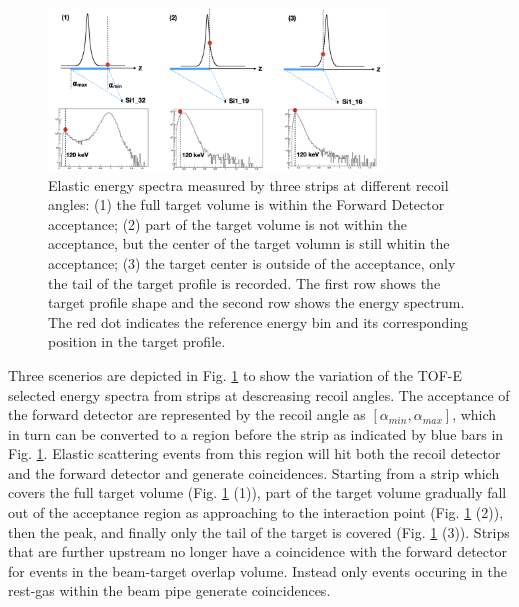 \documentclass[fleqn,twocolumn,a4paper]{ikpar}
\begin{document}
\begin{figure}[b]
  \centering
	\includegraphics[width=0.8\textwidth]{./target_density_determination.png}
  \caption{Elastic energy spectra measured by three strips at different recoil
    angles: (1) the full target volume is within the Forward Detector acceptance; (2) part of the target volume is not within the
  acceptance, but the center of the target volumn is still whitin the
  acceptance; (3) the target center is outside of the acceptance, only the tail
  of the target profile is recorded. The first row shows the target profile
  shape and the second row shows the energy spectrum.
  The red dot indicates the reference energy bin and its corresponding position in the target profile.}
  \label{fig:target_density_determination}
\end{figure}

\par
\medskip

Three scenerios are depicted in Fig. \ref{fig:target_density_determination} to
show the variation of the TOF-E selected energy spectra from strips at descreasing recoil angles.
The acceptance of the forward detector are represented by the recoil angle as
$[\alpha_{min}, \alpha_{max}]$, which in turn can be converted to a region
before the strip as indicated by blue bars in Fig. \ref{fig:target_density_determination}.
Elastic scattering events from this region will hit both the recoil detector and the
forward detector and generate coincidences.
Starting from a strip which covers the full target volume (Fig.
\ref{fig:target_density_determination} (1)), part of the target volume gradually
fall out of the acceptance region as approaching to the interaction point (Fig.
\ref{fig:target_density_determination} (2)), then the peak, and finally only the
tail of the target is covered (Fig. \ref{fig:target_density_determination} (3)).
Strips that are further upstream no longer have a coincidence with the forward detector for events in the beam-target overlap volume.
Instead only events occuring in the rest-gas within the beam pipe generate coincidences.
\end{document}
